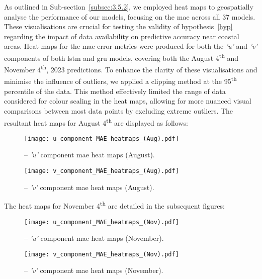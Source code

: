 As outlined in Sub-section~\ref{subsec:3.5.2}, we employed heat maps to geospatially analyse the performance of our models, focusing on the \acrshort{mae} across all 37 models. These visualisations are crucial for testing the validity of hypothesis~\ref{hyp} regarding the impact of data availability on predictive accuracy near coastal areas. Heat maps for the \acrshort{mae} error metrics were produced for both the \textit{'u'} and \textit{'v'} components of both \acrshort{lstm} and \acrshort{gru} models, covering both the August 4\textsuperscript{th} and November 4\textsuperscript{th}, 2023 predictions. To enhance the clarity of these visualisations and minimise the influence of outliers, we applied a clipping method at the 95\textsuperscript{th} percentile of the data. This method effectively limited the range of data considered for colour scaling in the heat maps, allowing for more nuanced visual comparisons between most data points by excluding extreme outliers. The resultant heat maps for August 4\textsuperscript{th} are displayed as follows:

\begin{figure}[H]
    \centering
    \texttt{[image: u\_component\_MAE\_heatmaps\_(Aug).pdf]}
    \caption[\textit{'u'} component MAE heat maps (August).]{-- \textit{'u'} component \acrshort{mae} heat maps (August).\label{fig_4.2}}
\end{figure}

\begin{figure}[H]
    \centering
    \texttt{[image: v\_component\_MAE\_heatmaps\_(Aug).pdf]}
    \caption[\textit{'v'} component MAE heat maps (August).]{-- \textit{'v'} component \acrshort{mae} heat maps (August).\label{fig_4.3}}
\end{figure}

\noindent The heat maps for November 4\textsuperscript{th} are detailed in the subsequent figures:

\begin{figure}[H]
    \centering
    \texttt{[image: u\_component\_MAE\_heatmaps\_(Nov).pdf]}
    \caption[\textit{'u'} component MAE heat maps (November).]{-- \textit{'u'} component \acrshort{mae} heat maps (November).\label{fig_4.4}}
\end{figure}

\begin{figure}[H]
    \centering
    \texttt{[image: v\_component\_MAE\_heatmaps\_(Nov).pdf]}
    \caption[\textit{'v'} component MAE heat maps (November).]{-- \textit{'v'} component \acrshort{mae} heat maps (November).\label{fig_4.5}}
\end{figure}


